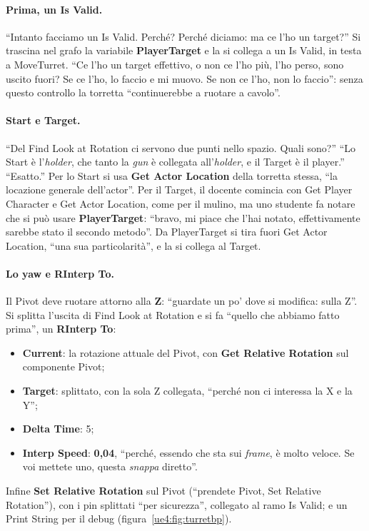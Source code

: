 \paragraph{Prima, un Is Valid.} ``Intanto facciamo un Is Valid. Perché? Perché diciamo:
ma ce l'ho un target?'' Si trascina nel grafo la variabile \textbf{PlayerTarget} e la si
collega a un Is Valid, in testa a MoveTurret. ``Ce l'ho un target effettivo, o non ce
l'ho più, l'ho perso, sono uscito fuori? Se ce l'ho, lo faccio e mi muovo. Se non ce
l'ho, non lo faccio'': senza questo controllo la torretta ``continuerebbe a ruotare a
cavolo''.

\paragraph{Start e Target.} ``Del Find Look at Rotation ci servono due punti nello
spazio. Quali sono?'' ``Lo Start è l'\emph{holder}, che tanto la \emph{gun} è collegata
all'\emph{holder}, e il Target è il player.'' ``Esatto.'' Per lo Start si usa
\textbf{Get Actor Location} della torretta stessa, ``la locazione generale
dell'actor''. Per il Target, il docente comincia con Get Player Character e Get Actor
Location, come per il mulino, ma uno studente fa notare che si può usare
\textbf{PlayerTarget}: ``bravo, mi piace che l'hai notato, effettivamente sarebbe stato
il secondo metodo''. Da PlayerTarget si tira fuori Get Actor Location, ``una sua
particolarità'', e la si collega al Target.

\paragraph{Lo yaw e RInterp To.} Il Pivot deve ruotare attorno alla \textbf{Z}:
``guardate un po' dove si modifica: sulla Z''. Si splitta l'uscita di Find Look at
Rotation e si fa ``quello che abbiamo fatto prima'', un \textbf{RInterp To}:
\begin{itemize}
  \item \textbf{Current}: la rotazione attuale del Pivot, con \textbf{Get Relative
        Rotation} sul componente Pivot;
  \item \textbf{Target}: splittato, con la sola Z collegata, ``perché non ci interessa
        la X e la Y'';
  \item \textbf{Delta Time}: 5;
  \item \textbf{Interp Speed}: \textbf{0,04}, ``perché, essendo che sta sui
        \emph{frame}, è molto veloce. Se voi mettete uno, questa \emph{snappa}
        diretto''.
\end{itemize}
Infine \textbf{Set Relative Rotation} sul Pivot (``prendete Pivot, Set Relative
Rotation''), con i pin splittati ``per sicurezza'', collegato al ramo Is Valid; e un
Print String per il debug (figura~\ref{ue4:fig:turretbp}).


